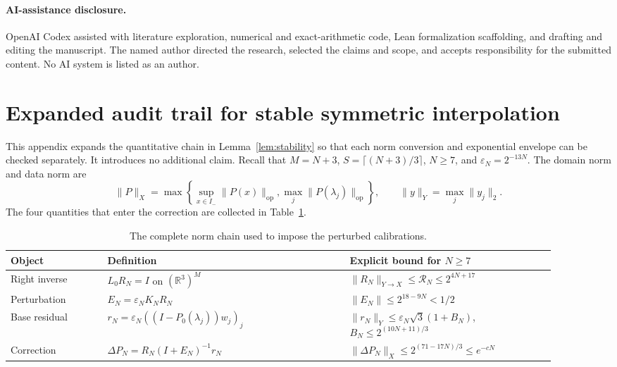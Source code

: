 \documentclass[11pt]{article}
\theoremstyle{remark}
\newcommand{\R}{\mathbb{R}}
\newcommand{\op}{\mathrm{op}}
\begin{document}
\paragraph{AI-assistance disclosure.}
OpenAI Codex assisted with literature exploration, numerical and exact-arithmetic
code, Lean formalization scaffolding, and drafting and editing the manuscript.
The named author directed the research, selected the claims and scope, and
accepts responsibility for the submitted content.  No AI system is listed as
an author.

\appendix
\section{Expanded audit trail for stable symmetric interpolation}
\label{app:stableaudit}

This appendix expands the quantitative chain in Lemma~\ref{lem:stability} so
that each norm conversion and exponential envelope can be checked separately.
It introduces no additional claim.  Recall that $M=N+3$,
$S=\lceil(N+3)/3\rceil$, $N\ge7$, and
$\varepsilon_N=2^{-13N}$.  The domain norm and data norm are
\[
 \|P\|_X=\max\left\{\sup_{x\in I_-}\|P(x)\|_{\op},
                         \max_j\|P(\lambda_j)\|_{\op}\right\},
 \qquad
 \|y\|_Y=\max_j\|y_j\|_2.
\]
The four quantities that enter the correction are collected in
Table~\ref{tab:auditchain}.

\begin{table}[H]
\centering
\small
\begin{tabular}{@{}p{0.16\linewidth}p{0.40\linewidth}p{0.34\linewidth}@{}}
\toprule
Object & Definition & Explicit bound for $N\ge7$\\
\midrule
Right inverse & $L_0R_N=I$ on $(\R^3)^M$
  & $\|R_N\|_{Y\to X}\le\mathcal R_N
     \le2^{4N+17}$\\
Perturbation & $E_N=\varepsilon_NK_NR_N$
  & $\|E_N\|\le2^{18-9N}<1/2$\\
Base residual &
  $r_N=\varepsilon_N((I-P_0(\lambda_j))w_j)_j$
  & $\|r_N\|_Y\le
     \varepsilon_N\sqrt3(1+B_N)$,
    $B_N\le2^{(10N+11)/3}$\\
Correction &
  $\Delta P_N=R_N(I+E_N)^{-1}r_N$
  & $\|\Delta P_N\|_X\le
     2^{(71-17N)/3}\le e^{-cN}$\\
\bottomrule
\end{tabular}
\caption{The complete norm chain used to impose the perturbed calibrations.}
\label{tab:auditchain}
\end{table}
\end{document}
